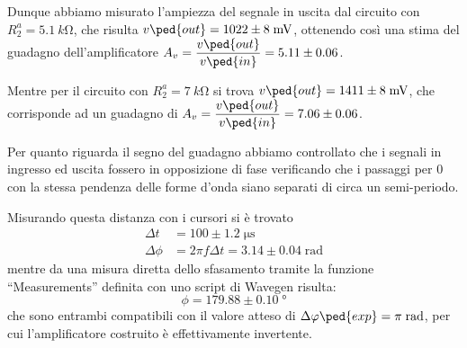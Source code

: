 \documentclass[10pt,a4paper]{article}
\begin{document}
Dunque abbiamo misurato l'ampiezza del segnale in uscita dal circuito con
$R_2^a = \SI{5.1}{k\ohm}$, che risulta $v\ped{out} = 1022 \pm 8 \; \si{m\V}$,
ottenendo così una stima del guadagno dell'amplificatore
$A_v = \dfrac{v\ped{out}}{v\ped{in}} = 5.11 \pm 0.06 $.

Mentre per il circuito con $R_2^a = \SI{7}{k\ohm}$ si trova
$v\ped{out} = 1411 \pm 8 \; \si{m\V}$, che corrisponde ad un guadagno di
$A_v = \dfrac{v\ped{out}}{v\ped{in}} = 7.06 \pm 0.06$.

Per quanto riguarda il segno del guadagno abbiamo controllato che i segnali in
ingresso ed uscita fossero in opposizione di fase verificando che i passaggi
per 0 con la stessa pendenza delle forme d'onda siano separati di circa un
semi-periodo.

Misurando questa distanza con i cursori si è trovato
\begin{align*}
\Delta t &= 100 \pm 1.2 \; \si{\micro\s}\\
\Delta \phi &= 2\pi f \Delta t = 3.14 \pm 0.04 \; \si{\radian}
\end{align*}
mentre da una misura diretta dello sfasamento tramite la funzione
``Measurements'' definita con uno script di Wavegen risulta:
\[
\phi = 179.88 \pm 0.10 \; \si{\degree}
\]
che sono entrambi compatibili con il valore atteso di $\Delta \phi\ped{exp}
= \pi \; \si{\radian}$, per cui l'amplificatore costruito è effettivamente
invertente.
\end{document}
